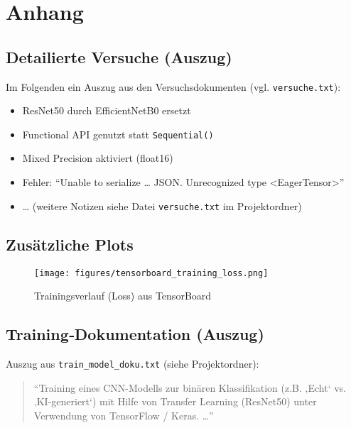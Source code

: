 \chapter{Anhang}
\label{chap:anhang}

\section{Detailierte Versuche (Auszug)}
Im Folgenden ein Auszug aus den Versuchsdokumenten (vgl. \texttt{versuche.txt}):

\begin{itemize}
  \item ResNet50 durch EfficientNetB0 ersetzt  
  \item Functional API genutzt statt \texttt{Sequential()}  
  \item Mixed Precision aktiviert (float16)  
  \item Fehler: \enquote{Unable to serialize … JSON. Unrecognized type <EagerTensor>}  
  \item … (weitere Notizen siehe Datei \texttt{versuche.txt} im Projektordner)
\end{itemize}

\section{Zusätzliche Plots}
\begin{figure}[h]
    \centering
    \texttt{[image: figures/tensorboard\_training\_loss.png]}
    \caption{Trainingsverlauf (Loss) aus TensorBoard}
    \label{fig:tboard_loss}
\end{figure}

\section{Training‐Dokumentation (Auszug)}
Auszug aus \texttt{train_model_doku.txt} (siehe Projektordner):
\begin{quote}
“Training eines CNN-Modells zur binären Klassifikation (z.B. ‚Echt‘ vs. ‚KI-generiert‘) mit Hilfe von Transfer Learning (ResNet50) unter Verwendung von TensorFlow / Keras. …”  
\end{quote}
